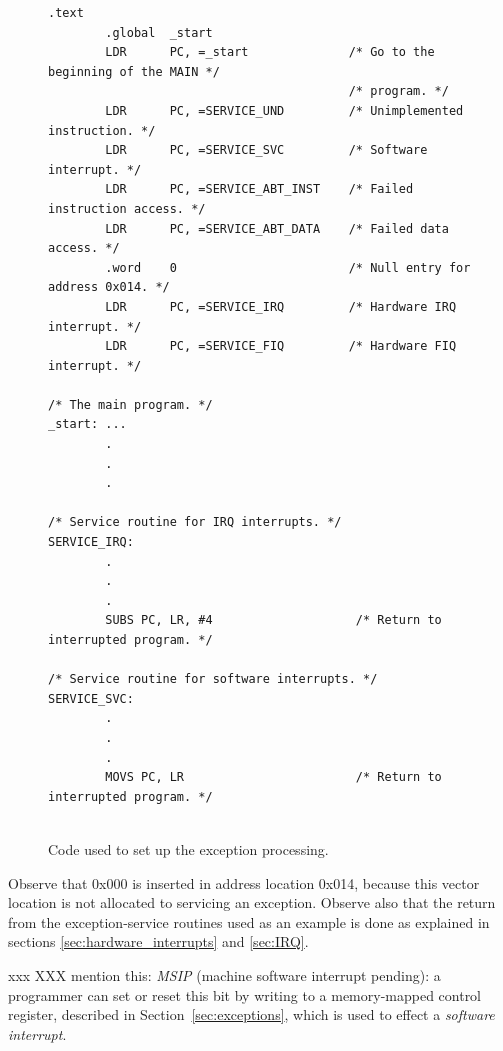 \documentclass[11pt, twoside, pdftex]{article}
\begin{document}
\begin{figure}[H]
\begin{center} %
\begin{lstlisting}[style=defaultArmStyle]
        .text
        .global  _start
        LDR      PC, =_start              /* Go to the beginning of the MAIN */
                                          /* program. */
        LDR      PC, =SERVICE_UND         /* Unimplemented instruction. */
        LDR      PC, =SERVICE_SVC         /* Software interrupt. */
        LDR      PC, =SERVICE_ABT_INST    /* Failed instruction access. */
        LDR      PC, =SERVICE_ABT_DATA    /* Failed data access. */
        .word    0                        /* Null entry for address 0x014. */
        LDR      PC, =SERVICE_IRQ         /* Hardware IRQ interrupt. */
        LDR      PC, =SERVICE_FIQ         /* Hardware FIQ interrupt. */
				
/* The main program. */
_start: ...
        .
        .
        .
				
/* Service routine for IRQ interrupts. */
SERVICE_IRQ:
        .
        .
        .
        SUBS PC, LR, #4                    /* Return to interrupted program. */

/* Service routine for software interrupts. */
SERVICE_SVC:
        .
        .
        .
        MOVS PC, LR                        /* Return to interrupted program. */
	

\end{lstlisting} %
\end{center}
	\vspace{-0.33in}
	\caption{Code used to set up the exception processing.}
	\label{fig:5}
\end{figure}

Observe that 0x000 is inserted in address location 0x014,
because this vector location is not allocated to servicing an
exception. Observe also that the return from the
exception-service routines used as an example is done as
explained in sections \ref{sec:hardware_interrupts} and \ref{sec:IRQ}.

xxx
XXX mention this: {\it MSIP} (machine software interrupt pending): a programmer can set or reset this
bit by writing to a memory-mapped control register, described in Section~\ref{sec:exceptions}, 
which is used to effect a {\it software interrupt}.
\end{document}
